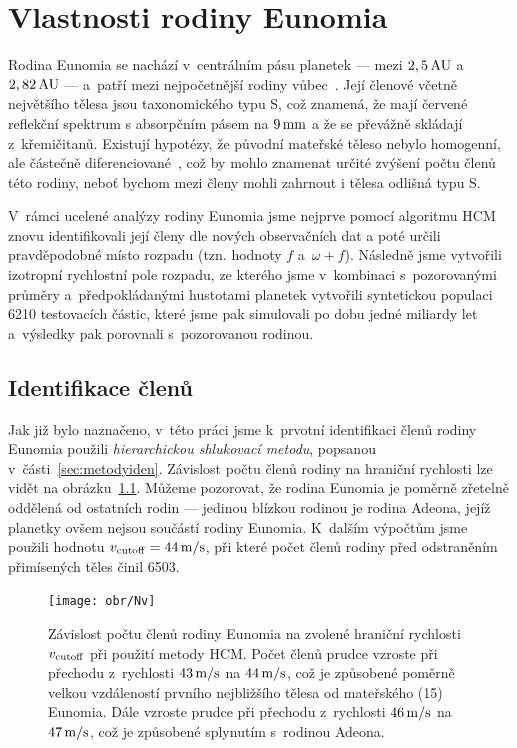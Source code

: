 \documentclass[A4paper, 12pt, oneside]{book}
\begin{document}
\chapter{Vlastnosti rodiny Eunomia} \label{ch:eunomia}
Rodina Eunomia se nachází v~centrálním pásu planetek --- mezi $2,5\,{\rm AU}$ a~$2,82\,{\rm AU}$ --- a~patří mezi nejpočetnější rodiny vůbec~\cite{nesvorny15}. Její členové včetně největšího tělesa jsou taxonomického typu S, což znamená, že mají červené reflekční spektrum s absorpčním pásem na $9\,{\rm mm}$ a že se převážně skládají z~křemičitanů. Existují hypotézy, že původní mateřské těleso nebylo homogenní, ale částečně diferenciované~\cite{nathues05}, což by mohlo znamenat určité zvýšení počtu členů této rodiny, neboť bychom mezi členy mohli zahrnout i tělesa odlišná typu S.

V~rámci ucelené analýzy rodiny Eunomia jsme nejprve pomocí algoritmu HCM znovu identifikovali její členy dle nových observačních dat a poté určili pravděpodobné místo rozpadu (tzn. hodnoty $f$ a~$\omega + f$). Následně jsme vytvořili izotropní rychlostní pole rozpadu, ze kterého jsme v~kombinaci s~pozorovanými průměry a~předpokládanými hustotami planetek vytvořili syntetickou populaci 6210 testovacích částic, které jsme pak simulovali po dobu jedné miliardy let a~výsledky pak porovnali s~pozorovanou rodinou.

\section{Identifikace členů}

Jak již bylo naznačeno, v~této práci jsme k~prvotní identifikaci členů rodiny Eunomia použili \textit{hierarchickou shlukovací metodu}, popsanou v~části~\ref{sec:metodyiden}. Závislost počtu členů rodiny na hraniční rychlosti lze vidět na obrázku~\ref{fig:Nv}. Můžeme pozorovat, že rodina Eunomia je poměrně zřetelně oddělená od ostatních rodin --- jedinou blízkou rodinou je rodina Adeona, jejíž planetky ovšem nejsou součástí rodiny Eunomia. K~dalším výpočtům jsme použili hodnotu $v_{\rm cutoff}=44\,{\rm m/s}$, při které počet členů rodiny před odstraněním přimísených těles činil 6503.

\begin{figure}
	\centering
	\texttt{[image: obr/Nv]}
	\caption{Závislost počtu členů rodiny Eunomia na zvolené hraniční rychlosti $v_{\rm cutoff}$ při použití metody HCM. Počet členů prudce vzroste při přechodu z~rychlosti $43\,{\rm m/s}$ na $44\,{\rm m/s}$, což je způsobené poměrně velkou vzdáleností prvního nejbližšího tělesa od mateřského (15) Eunomia. Dále vzroste prudce při přechodu z~rychlosti $46\,{\rm m/s}$ na $47\,{\rm m/s}$, což je způsobené splynutím s~rodinou Adeona.}
	\label{fig:Nv}
\end{figure}
\end{document}
